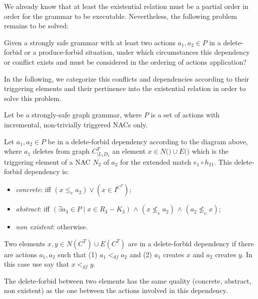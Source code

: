 We already know that at least the existential relation must be a partial order in order for the grammar to be executable. Nevertheless, the following problem remains to be solved:

\begin{intuition}
  Given a strongly safe grammar \doublyTypedGraphGrammarCore{} with at least two actions $a_1, a_2 \in P$ in a delete-forbid or a produce-forbid situation, under which circumstances this dependency or conflict exists and must be considered in the ordering of actions application?
\end{intuition}

In the following, we categorize this conflicts and dependencies according to their triggering elements and their pertinence into the existential relation in order to solve this problem.

\begin{definition} Let \doublyTypedGraphGrammarCore{} be a strongly-safe graph grammar, where $P$ is a set of actions with incremental, non-trivially triggered NACs only.

\hfill

  Let $a_1, a_2 \in P$ be in a delete-forbid dependency according to the diagram above, where $a_1$ deletes from graph $C^T_{|L_1D_1}$ an element $x \in N($\coreGraph$) \cup E($\coreGraph$)$ which is the triggering element of a NAC $N_2$ of $a_2$ for the extended match $e_1 \circ h_{21}$. This delete-forbid dependency is:

\begin{itemize}
  \item \emph{concrete}: iff $(x \leq_e a_2) \lor (x \in I^{C^T})$;
  \item \emph{abstract}: iff $(\exists a_3 \in P \mid x \in R_3 - K_3)$ $\land$ $(x \not\leq_e a_2)$ $\land$ $(a_2 \not\leq_e x)$;
  \item \emph{non existent}: otherwise.
\end{itemize}

  Two elements $x, y \in N(C^T) \cup E(C^T)$ are in a delete-forbid dependency if there are actions $a_1,a_2$ such that (1) $a_1 <_{df} a_2$ and (2) $a_1$ creates $x$ and $a_2$ creates $y$. In this case use say that $x <_{df} y$.

  The delete-forbid between two elements has the same quality (concrete, abstract, non existent) as the one between the actions involved in this dependency.
\end{definition}



